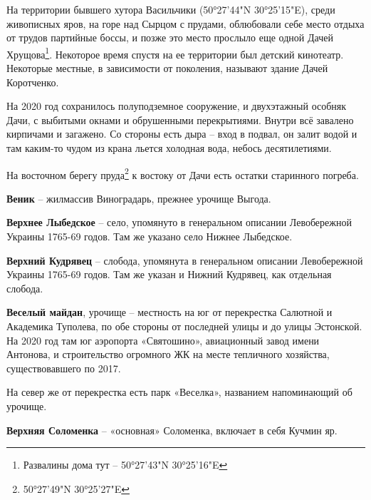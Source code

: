 На территории бывшего хутора Васильчики (50°27'44"N 30°25'15"E), среди живописных яров, на горе над Сырцом с прудами, облюбовали себе место отдыха от трудов партийные боссы, и позже это место прослыло еще одной Дачей Хрущова\footnote{Развалины дома тут – 50°27'43"N 30°25'16"E}. Некоторое время спустя на ее территории был детский кинотеатр. Некоторые местные, в зависимости от поколения, называют здание Дачей Коротченко.

На 2020 год сохранилось полуподземное сооружение, и двухэтажный особняк Дачи, с выбитыми окнами и обрушенными перекрытиями. Внутри всё завалено кирпичами и загажено. Со стороны есть дыра – вход в подвал, он залит водой и там каким-то чудом из крана льется холодная вода, небось десятилетиями.

На восточном берегу пруда\footnote{50°27'49"N 30°25'27"E} к востоку от Дачи есть остатки старинного погреба.\\  

\medskip

\textbf{Веник} – жилмассив Виноградарь, прежнее урочище Выгода.\\

\medskip

\textbf{Верхнее Лыбедское} – село, упомянуто в генеральном описании Левобережной Украины 1765-69 годов. Там же указано село Нижнее Лыбедское.\\

\medskip

\textbf{Верхний Кудрявец} – слобода, упомянута в генеральном описании Левобережной Украины 1765-69 годов. Там же указан и Нижний Кудрявец, как отдельная слобода.\\

\medskip

\textbf{Веселый майдан}, урочище – местность на юг от перекрестка Салютной и Академика Туполева, по обе стороны от последней улицы и до улицы Эстонской. На 2020 год там юг аэропорта «Святошино», авиационный завод имени Антонова, и строительство огромного ЖК на месте тепличного хозяйства, существовавшего по 2017. 

На север же от перекрестка есть парк «Веселка», названием напоминающий об урочище.\\

\medskip

\textbf{Верхняя Соломенка} – «основная» Соломенка, включает в себя Кучмин яр.\\

\medskip


